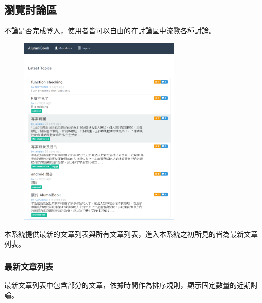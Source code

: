 \documentclass[12pt]{article}
\begin{document}
\subsection{瀏覽討論區}
不論是否完成登入，使用者皆可以自由的在討論區中流覽各種討論。
\begin{figure}[H]
\centering\includegraphics[width=0.7\textwidth]{img/read01.png}
\end{figure}
本系統提供最新的文章列表與所有文章列表，進入本系統之初所見的皆為最新文章列表。

\subsubsection{最新文章列表}
最新文章列表中包含部分的文章，依據時間作為排序規則，顯示固定數量的近期討論。
\end{document}
